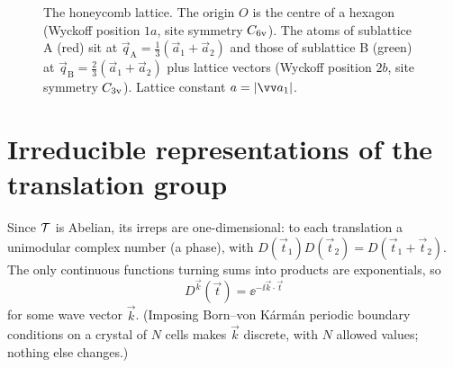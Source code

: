 \begin{figure}[ht]
\centering
{}
\caption{The honeycomb lattice. The origin $O$ is the centre of a hexagon (Wyckoff
position $1a$, site symmetry $C_{6\mathrm{v}}$). The atoms of sublattice A (red) sit at
$\vec{q}_{\mathrm{A}}=\tfrac13(\vec{a}_1+\vec{a}_2)$ and those of sublattice B (green) at
$\vec{q}_{\mathrm{B}}=\tfrac23(\vec{a}_1+\vec{a}_2)$ plus lattice vectors (Wyckoff position
$2b$, site symmetry $C_{3\mathrm{v}}$). Lattice constant $a=\abs{\vec{a}_1}$.}
\label{fig:honeycomb}
\end{figure}

\section{Irreducible representations of the translation group}

Since $\mathcal{T}$ is Abelian, its irreps are one-dimensional: to each translation a
unimodular complex number (a phase), with $D(\vec{t}_1)D(\vec{t}_2)=D(\vec{t}_1+\vec{t}_2)$.
The only continuous functions turning sums into products are exponentials, so
\begin{equation}\label{eq:Tirrep}
D^{\vec{k}}(\vec{t})=\ee^{-\ii\vec{k}\cdot\vec{t}}
\end{equation}
for some wave vector $\vec{k}$. (Imposing Born--von K\'arm\'an periodic boundary
conditions on a crystal of $N$ cells makes $\vec{k}$ discrete, with $N$ allowed values;
nothing else changes.)

